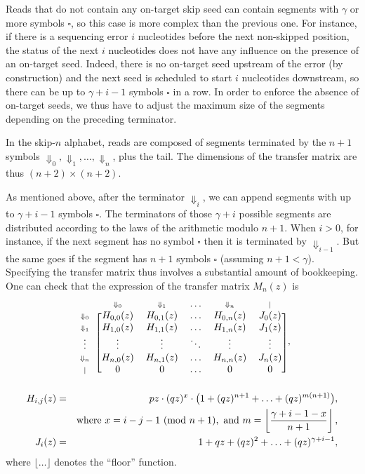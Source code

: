 \documentclass{article}
\newcommand{\Dn}[1]{\scriptstyle{\Downarrow_{#1}}}
\newcommand{\nd}{\scriptstyle{|}}
\newcommand{\modulo}[1]{\ (\mathrm{mod}\ #1)}
\begin{document}
Reads that do not contain any on-target skip seed can contain segments
with $\gamma$ or more symbols $\square$, so this case is more complex than
the previous one. For instance, if there is a sequencing error $i$
nucleotides before the next non-skipped position, the status of the next
$i$ nucleotides does not have any influence on the presence of an
on-target seed. Indeed, there is no on-target seed upstream of the error
(by construction) and the next seed is scheduled to start $i$ nucleotides
downstream, so there can be up to $\gamma+i-1$ symbols $\square$ in a row.
In order to enforce the absence of on-target seeds, we thus have to adjust
the maximum size of the segments depending on the preceding terminator.

In the skip-$n$ alphabet, reads are composed of segments terminated by the
$n+1$ symbols $\Downarrow_0, \Downarrow_1, \ldots, \Downarrow_n$, plus the
tail. The dimensions of the transfer matrix are thus $(n+2) \times (n+2)$.

As mentioned above, after the terminator $\Downarrow_i$, we can append
segments with up to $\gamma+i-1$ symbols $\square$. The terminators of
those $\gamma+i$ possible segments are distributed according to the laws
of the arithmetic modulo $n+1$. When $i > 0$, for instance, if the next
segment has no symbol $\square$ then it is terminated by
$\Downarrow_{i-1}$. But the same goes if the segment has $n+1$ symbols
$\square$ (assuming $n+1 < \gamma$). Specifying the transfer matrix thus
involves a substantial amount of bookkeeping. One can check that the
expression of the transfer matrix $M_n(z)$ is
\begin{equation*}
\begin{blockarray}{cccccc}
   & \Dn{0} & \Dn{1} & \ldots & \Dn{n} & \nd \\
\begin{block}{c[ccccc]}
\Dn{0} & H_{0,0}(z) & H_{0,1}(z) & \ldots & H_{0,n}(z) & J_0(z) \\
\Dn{1} & H_{1,0}(z) & H_{1,1}(z) & \ldots & H_{1,n}(z) & J_1(z) \\
\vdots & \vdots & \vdots & \ddots & \vdots & \vdots \\
\Dn{n} & H_{n,0}(z) & H_{n,1}(z) & \ldots & H_{n,n}(z) & J_n(z) \\
\nd & 0 & 0 & \ldots & 0 & 0 \\
\end{block}
\end{blockarray},
\end{equation*}
\begin{eqnarray}
H_{i,j}(z) &=& pz \cdot (qz)^x \cdot \big( 1 + (qz)^{n+1} +
  \ldots + (qz)^{m(n+1)} \big), \\
\notag
  &\;& \text{where } x = i-j-1 \modulo{n+1},
  \text{ and } m = \left\lfloor
  \frac{\gamma+i-1-x}{n+1} \right\rfloor, \\
J_i(z) &=& 1 + qz + (qz)^2 + \ldots + (qz)^{\gamma+i-1},
\end{eqnarray}
where $\lfloor \ldots \rfloor$ denotes the ``floor'' function.
\end{document}
